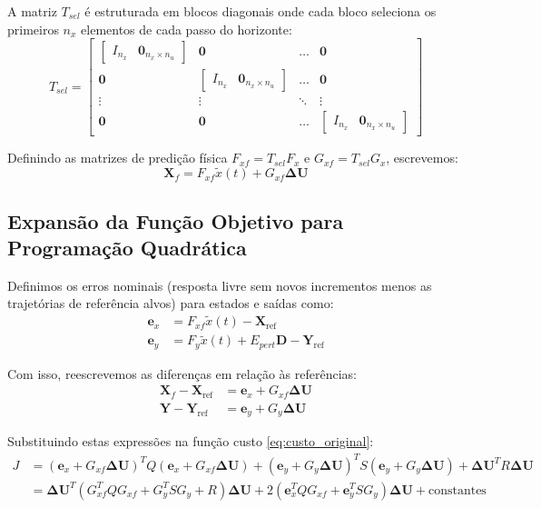 \documentclass[12pt]{article}
\begin{document}
A matriz $T_{sel}$ é estruturada em blocos diagonais onde cada bloco seleciona os primeiros $n_x$ elementos de cada passo do horizonte:
\begin{equation}
T_{sel} = \begin{bmatrix} 
\begin{bmatrix} I_{n_x} & \bm{0}_{n_x \times n_u} \end{bmatrix} & \bm{0} & \dots & \bm{0} \\
\bm{0} & \begin{bmatrix} I_{n_x} & \bm{0}_{n_x \times n_u} \end{bmatrix} & \dots & \bm{0} \\
\vdots & \vdots & \ddots & \vdots \\
\bm{0} & \bm{0} & \dots & \begin{bmatrix} I_{n_x} & \bm{0}_{n_x \times n_u} \end{bmatrix}
\end{bmatrix}
\end{equation}

Definindo as matrizes de predição física $F_{xf} = T_{sel} F_x$ e $G_{xf} = T_{sel} G_x$, escrevemos:
\begin{equation}
\bm{X}_f = F_{xf} \tilde{x}(t) + G_{xf} \bm{\Delta U}
\end{equation}

\subsection{Expansão da Função Objetivo para Programação Quadrática}
\label{subsec:expansao}
Definimos os erros nominais (resposta livre sem novos incrementos menos as trajetórias de referência alvos) para estados e saídas como:
\begin{align}
\bm{e}_x &= F_{xf} \tilde{x}(t) - \bm{X}_{\text{ref}} \\
\bm{e}_y &= F_y \tilde{x}(t) + E_{pert} \bm{D} - \bm{Y}_{\text{ref}}
\end{align}

Com isso, reescrevemos as diferenças em relação às referências:
\begin{align}
\bm{X}_f - \bm{X}_{\text{ref}} &= \bm{e}_x + G_{xf} \bm{\Delta U} \\
\bm{Y} - \bm{Y}_{\text{ref}} &= \bm{e}_y + G_y \bm{\Delta U}
\end{align}

Substituindo estas expressões na função custo \eqref{eq:custo_original}:
\begin{align}
J &= (\bm{e}_x + G_{xf} \bm{\Delta U})^T Q (\bm{e}_x + G_{xf} \bm{\Delta U}) + (\bm{e}_y + G_y \bm{\Delta U})^T S (\bm{e}_y + G_y \bm{\Delta U}) + \bm{\Delta U}^T R \bm{\Delta U} \nonumber \\
  &= \bm{\Delta U}^T (G_{xf}^T Q G_{xf} + G_y^T S G_y + R) \bm{\Delta U} + 2 (\bm{e}_x^T Q G_{xf} + \bm{e}_y^T S G_y) \bm{\Delta U} + \text{constantes}
\end{align}
\end{document}
